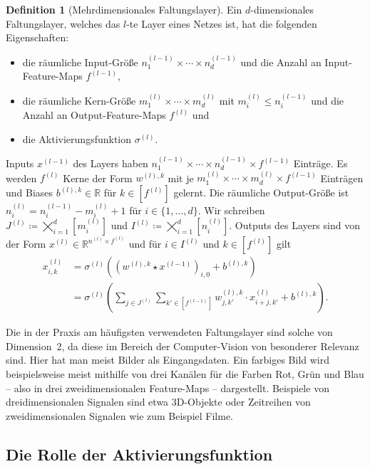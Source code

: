 \documentclass[paper=a4, 	%
		fontsize=11pt,
		abstract=true, 	%
		headsepline, 	%
		notitlepage	%
		]{scrartcl}
\theoremstyle{definition}
\newtheorem{definition}[theorem]{Definition}
\newcommand{\R}{\mathbb{R}}
\newcommand{\fNat}[1]{[ #1 ]}
\begin{document}
\begin{definition}[Mehrdimensionales Faltungslayer]\label{def:multi-dimensional-conv-layer}
    Ein $d$-dimensionales Faltungslayer, welches das $l$-te Layer eines Netzes ist, hat die folgenden Eigenschaften:
    \begin{itemize}
        \item die räumliche Input-Größe $n^{(l-1)}_1\times\cdots\times n^{(l-1)}_d$ und die Anzahl an Input-Feature-Maps $f^{(l-1)}$,
        \item die räumliche Kern-Größe $m^{(l)}_1\times \cdots \times m^{(l)}_d$ mit $m^{(l)}_i \leq n^{(l-1)}_i$ und die Anzahl an Output-Feature-Maps $f^{(l)}$ und
        \item die Aktivierungsfunktion $\sigma^{(l)}$.
    \end{itemize}
    Inputs $x^{(l-1)}$ des Layers haben $n^{(l-1)}_1\times\cdots\times n^{(l-1)}_d \times f^{(l-1)}$ Einträge.
    Es werden $f^{(l)}$ Kerne der Form $w^{(l),k}$ mit je $m^{(l)}_1\times\cdots\times m^{(l)}_d \times f^{(l-1)}$ Einträgen und Biases $b^{(l),k}\in\R$ für  $k\in \fNat{f^{(l)}}$ gelernt.
    Die räumliche Output-Größe ist $n^{(l)}_i = n^{(l-1)}_i-  m^{(l)}_i + 1$ für $i\in\{1,\dots, d\}$.
    Wir schreiben $J^{(l)} \coloneqq \bigtimes_{i=1}^d [m^{(l)}_i]$ und $I^{(l)} \coloneqq \bigtimes_{i=1}^d [n^{(l)}_i]$.
    Outputs des Layers sind von der Form $x^{(l)}\in \R^{n^{(l)}\times f^{(l)}}$ und für $i\in I^{(l)}$ und $k\in\fNat{f^{(l)}}$ gilt
    \begin{align*}
        x^{(l)}_{i,k}
        &=  \sigma^{(l)}\left( (w^{(l),k} \star x^{(l-1)})_{i,0} + b^{(l),k} \right)\\
        &= \sigma^{(l)} \left( 
            \sum_{j \in J^{(l)}} \sum_{k'\in \fNat{f^{(l-1)}}}
            w^{(l),k}_{j,k'} \cdot x^{(l)}_{i+j, k'} + b^{(l), k}
        \right).
    \end{align*}
\end{definition}

Die in der Praxis am häufigsten verwendeten Faltungslayer sind solche von Dimension~$2$, da diese im Bereich der Computer-Vision von besonderer Relevanz sind.
Hier hat man meist Bilder als Eingangsdaten.
Ein farbiges Bild wird beispielsweise meist mithilfe von drei Kanälen für die Farben Rot, Grün und Blau -- also in drei zweidimensionalen Feature-Maps -- dargestellt.
Beispiele von dreidimensionalen Signalen sind etwa 3D-Objekte oder Zeitreihen von zweidimensionalen Signalen wie zum Beispiel Filme.

\subsection{Die Rolle der Aktivierungsfunktion}
\end{document}
